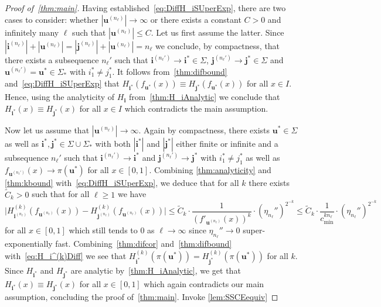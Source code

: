 \documentclass[12pt,]{article}
\theoremstyle{definition}
\theoremstyle{remark}
\newcommand{\0}{\mathbf{0}}
\newcommand{\bi}{\mathbf{i}}
\newcommand{\bj}{\mathbf{j}}
\newcommand{\bu}{\mathbf{u}}
\begin{document}
{\begin{proof}[Proof of~\cref{thm:main}]
Having established~\cref{eq:DiffH_iSUperExp}, there are two cases to consider: whether $|\bu^{(n_\ell)}| \to \infty$ or there exists a constant $C>0$ and infinitely many $\ell$ such that $|\bu^{(n_\ell)}| \leq C$. Let us first assume the latter. Since $|\bi^{(n_\ell)}|+ |\bu^{(n_\ell)}| = |\bj^{(n_\ell)}|+|\bu^{(n_\ell)}| = n_\ell$ we conclude, by compactness, that
there exists a subsequence $n_\ell'$ such that $\bi^{(n_\ell')} \to \bi^*\in\Sigma$,
$\bj^{(n_\ell')}\to\bj^*\in\Sigma$ and $\bu^{(n_\ell')}=\bu^*\in\Sigma_*$ with $i_1^*\neq j_1^*$.
It follows from~\cref{thm:difbound} and~\cref{eq:DiffH_iSUperExp} that
$
  H_{\bi^*}(f_{\bu^*}(x))\equiv H_{\bj^*}(f_{\bu^*}(x))
$
for all $x\in I$.  Hence, using the analyticity of $H_{\bi}$ from~\cref{thm:H_iAnalytic} we conclude that $H_{\bi^*}(x) \equiv H_{\bj^*}(x)$ for all $x\in I$ which contradicts the main assumption.

Now let us assume that $|\bu^{(n_\ell)}| \to \infty$. Again by compactness, there exists $\bu^*\in\Sigma$ as well as $\bi^*,\bj^*\in\Sigma\cup\Sigma_*$ {\color{red} with both $|\bi^*|$ and $|\bj^*|$ either finite or infinite} and a
subsequence $n_\ell'$ such that $\bi^{(n_\ell')}\to \bi^*$ and $\bj^{(n_\ell')}\to \bj^*$ with $i_1^*\neq j_1^*$ as well as $f_{\bu^{(n_\ell')}}(x) \to \pi(\bu^*)$ for all $x\in[0,1]$.  Combining \cref{thm:analyticity} and \cref{thm:kbound} with~\cref{eq:DiffH_iSUperExp}, we deduce that for all $k$ there
exists $\widetilde{C}_k>0$ such that for all $\ell\geq 1$ we have
\begin{equation}\label{eq:H_i^(k)Diff}
  \big|H_{\bi^{(n_\ell)}}^{(k)}(f_{\bu^{(n_\ell)}}(x)) - H_{\bj^{(n_\ell)}}^{(k)}(f_{\bu^{(n_\ell)}}(x))\big|
  \leq \widetilde{C}_k \cdot \frac{1}{(f'_{\bu^{(n_\ell)}}(x))^k}\cdot\left(\eta_{n_\ell}''\right)^{2^{-k}}\leq\widetilde{C}_k \cdot \frac{1}{c_{\min}^{k n_\ell}}\cdot\left(\eta_{n_\ell}''\right)^{2^{-k}}
\end{equation}
for all $x\in[0,1]$ which still tends to $0$ as $\ell\to\infty$ since $\eta_{n_{\ell}}''\to 0$ super-exponentially fast. Combining~\cref{thm:difcor} and~\cref{thm:difbound} with~\cref{eq:H_i^(k)Diff} we see that $H_{\bi^*}^{(k)}(\pi(\bu^*))=H_{\bj^*}^{(k)}(\pi(\bu^*))$ for all $k$.
Since $H_{\bi^*}$ and $H_{\bj^*}$ are analytic by~\cref{thm:H_iAnalytic}, we get that $H_{\bi^*}(x)\equiv H_{\bj^*}(x)$ for all
$x\in[0,1]$ which again contradicts our main assumption, concluding the proof of~\cref{thm:main}. 
{\color{red} Invoke \cref{lem:SSCEequiv}}
\end{proof}


}
\end{document}
